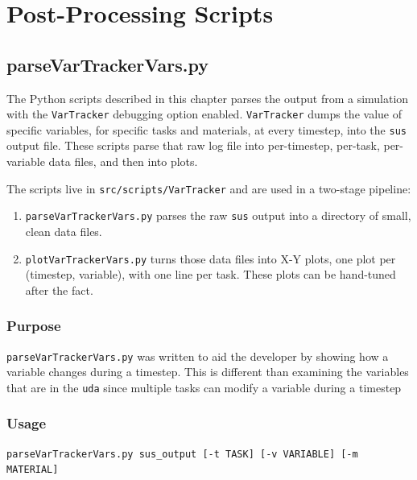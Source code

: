 
\chapter{Post-Processing Scripts} \label{Chapter:scripts}



\section{parseVarTrackerVars.py}

The Python scripts described in this chapter parses the output from a simulation
with the \verb|VarTracker| debugging option enabled.
\verb|VarTracker| dumps the value of specific variables, for specific
tasks and materials, at every timestep, into the \verb|sus|
 output file. These scripts parse that raw log file into per-timestep,
per-task, per-variable data files, and then into plots.

The scripts live in \verb|src/scripts/VarTracker| and are used in a
two-stage pipeline:

\begin{enumerate}
  \item \verb|parseVarTrackerVars.py| parses the raw \verb|sus| output into a
    directory of small, clean data files.
  \item \verb|plotVarTrackerVars.py| turns those data files into X-Y
    plots, one plot per (timestep, variable), with one line per task.  These plots can be hand-tuned after the fact.
\end{enumerate}

\subsection{Purpose}
\verb|parseVarTrackerVars.py| was written to aid the developer by showing  
how a variable changes during a timestep. This is different than examining the variables that are in the \verb|uda| since multiple tasks can modify a variable during a timestep

\subsection{Usage}
\begin{Verbatim}[fontsize=\footnotesize]
  parseVarTrackerVars.py sus_output [-t TASK] [-v VARIABLE] [-m MATERIAL]
\end{Verbatim}


